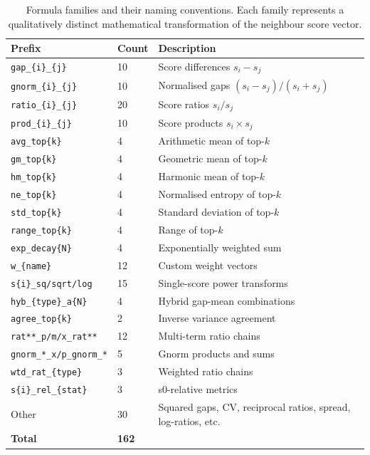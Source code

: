 \documentclass[11pt,a4paper]{article}
\newcommand{\formula}[1]{\texttt{#1}}
\begin{document}
\begin{table}[htbp]
\centering
\caption{Formula families and their naming conventions. Each family represents a qualitatively distinct mathematical transformation of the neighbour score vector.}
\label{tab:formulas}
\begin{tabular}{@{}llp{6.5cm}@{}}
\toprule
\textbf{Prefix} & \textbf{Count} & \textbf{Description} \\
\midrule
\formula{gap\_\{i\}\_\{j\}} & 10 & Score differences $s_i - s_j$ \\
\formula{gnorm\_\{i\}\_\{j\}} & 10 & Normalised gaps $(s_i - s_j)/(s_i + s_j)$ \\
\formula{ratio\_\{i\}\_\{j\}} & 20 & Score ratios $s_i / s_j$ \\
\formula{prod\_\{i\}\_\{j\}} & 10 & Score products $s_i \times s_j$ \\
\formula{avg\_top\{k\}} & 4 & Arithmetic mean of top-$k$ \\
\formula{gm\_top\{k\}} & 4 & Geometric mean of top-$k$ \\
\formula{hm\_top\{k\}} & 4 & Harmonic mean of top-$k$ \\
\formula{ne\_top\{k\}} & 4 & Normalised entropy of top-$k$ \\
\formula{std\_top\{k\}} & 4 & Standard deviation of top-$k$ \\
\formula{range\_top\{k\}} & 4 & Range of top-$k$ \\
\formula{exp\_decay\{N\}} & 4 & Exponentially weighted sum \\
\formula{w\_\{name\}} & 12 & Custom weight vectors \\
\formula{s\{i\}\_sq/sqrt/log} & 15 & Single-score power transforms \\
\formula{hyb\_\{type\}\_a\{N\}} & 4 & Hybrid gap-mean combinations \\
\formula{agree\_top\{k\}} & 2 & Inverse variance agreement \\
\formula{rat**\_p/m/x\_rat**} & 12 & Multi-term ratio chains \\
\formula{gnorm\_*\_x/p\_gnorm\_*} & 5 & Gnorm products and sums \\
\formula{wtd\_rat\_\{type\}} & 3 & Weighted ratio chains \\
\formula{s\{i\}\_rel\_\{stat\}} & 3 & s0-relative metrics \\
Other & 30 & Squared gaps, CV, reciprocal ratios, spread, log-ratios, etc. \\
\midrule
\textbf{Total} & \textbf{162} & \\
\bottomrule
\end{tabular}
\end{table}
\end{document}
